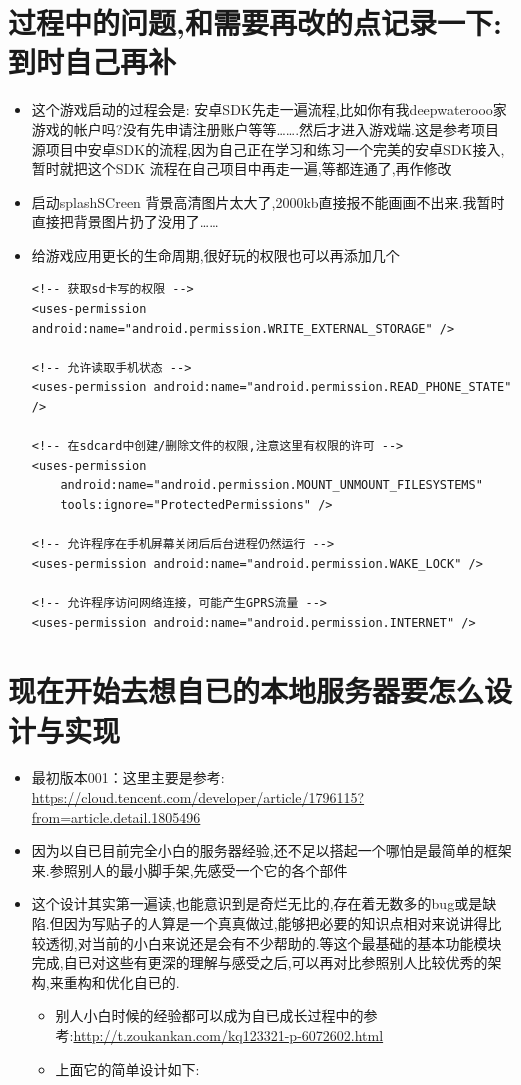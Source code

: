 \documentclass[9pt, b5paper]{article}
\begin{document}
\section{过程中的问题,和需要再改的点记录一下: 到时自己再补}
\label{sec-3}
\begin{itemize}
\item 这个游戏启动的过程会是: 安卓SDK先走一遍流程,比如你有我deepwaterooo家游戏的帐户吗?没有先申请注册账户等等\ldots{}\ldots{}.然后才进入游戏端.这是参考项目源项目中安卓SDK的流程,因为自己正在学习和练习一个完美的安卓SDK接入,暂时就把这个SDK 流程在自己项目中再走一遍,等都连通了,再作修改
\item 启动splashSCreen 背景高清图片太大了,2000kb直接报不能画画不出来.我暂时直接把背景图片扔了没用了\ldots{}\ldots{}
\item 给游戏应用更长的生命周期,很好玩的权限也可以再添加几个
\begin{verbatim}
<!-- 获取sd卡写的权限 -->
<uses-permission android:name="android.permission.WRITE_EXTERNAL_STORAGE" />

<!-- 允许读取手机状态 -->
<uses-permission android:name="android.permission.READ_PHONE_STATE" />

<!-- 在sdcard中创建/删除文件的权限,注意这里有权限的许可 -->
<uses-permission
    android:name="android.permission.MOUNT_UNMOUNT_FILESYSTEMS"
    tools:ignore="ProtectedPermissions" />

<!-- 允许程序在手机屏幕关闭后后台进程仍然运行 -->
<uses-permission android:name="android.permission.WAKE_LOCK" />

<!-- 允许程序访问网络连接，可能产生GPRS流量 -->
<uses-permission android:name="android.permission.INTERNET" />
\end{verbatim}
\end{itemize}

\section{现在开始去想自已的本地服务器要怎么设计与实现}
\label{sec-4}
\begin{itemize}
\item 最初版本001：这里主要是参考:　\url{https://cloud.tencent.com/developer/article/1796115?from=article.detail.1805496}
\item 因为以自已目前完全小白的服务器经验,还不足以搭起一个哪怕是最简单的框架来.参照别人的最小脚手架,先感受一个它的各个部件
\item 这个设计其实第一遍读,也能意识到是奇烂无比的,存在着无数多的bug或是缺陷.但因为写贴子的人算是一个真真做过,能够把必要的知识点相对来说讲得比较透彻,对当前的小白来说还是会有不少帮助的.等这个最基础的基本功能模块完成,自已对这些有更深的理解与感受之后,可以再对比参照别人比较优秀的架构,来重构和优化自已的. 
\begin{itemize}
\item 别人小白时候的经验都可以成为自已成长过程中的参考:\url{http://t.zoukankan.com/kq123321-p-6072602.html}
\item 上面它的简单设计如下:
\end{itemize}
\end{itemize}
\end{document}
